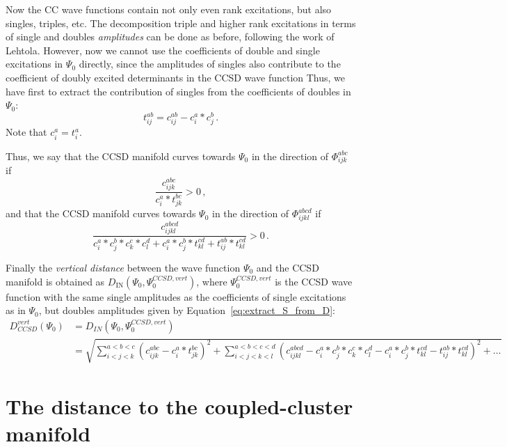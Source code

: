 Now the CC wave functions contain not only even rank excitations,
but also singles, triples, etc.
The decomposition triple and higher rank excitations in terms of single and doubles \emph{amplitudes}
can be done as before, following the work of Lehtola.
However, now we cannot use the coefficients of double and single excitations in $\Psi_0$
directly, since the amplitudes of singles also contribute to the coefficient of doubly excited
determinants in the CCSD wave function
Thus, we have first to extract the contribution of singles
from the coefficients of doubles in $\Psi_0$:
\begin{equation}\label{eq:extract_S_from_D}
  t_{ij}^{ab} = c_{ij}^{ab} - c_i^a * c_j^b\,.
\end{equation}
Note that $c_i^a = t_i^a$.

Thus, we say that the CCSD manifold curves towards $\Psi_0$ in the direction of
$\Phi_{ijk}^{abc}$ if
\begin{equation}
  \frac{c_{ijk}^{abc}}{c_{i}^{a} * t_{jk}^{bc}} > 0\,,
\end{equation}
and that the CCSD manifold curves towards $\Psi_0$ in the direction of
$\Phi_{ijkl}^{abcd}$ if
\begin{equation}
  \frac{c_{ijkl}^{abcd}}
  {c_{i}^{a} * c_{j}^{b} * c_{k}^{c} * c_{l}^{d}
    + c_{i}^{a} * c_{j}^{b} * t_{kl}^{cd}
    + t_{ij}^{ab} * t_{kl}^{cd}} > 0\,.
\end{equation}

Finally the \emph{vertical distance} between the wave function $\Psi_0$
and the CCSD manifold is obtained as
$D_\text{IN}(\Psi_0, \Psi_0^{CCSD,vert})$, where $\Psi_0^{CCSD,vert}$ is the CCSD wave function
with the same single amplitudes as the coefficients of single excitations as in $\Psi_0$,
but doubles amplitudes given by Equation~\eqref{eq:extract_S_from_D}:
\begin{equation}
  \begin{split}
    D_{CCSD}^{vert}(\Psi_0) &= 
    D_{IN}(\Psi_0, \Psi_0^{CCSD,vert})\\
    &= \sqrt{
      \sum_{i<j<k}^{a<b<c}
      (c_{ijk}^{abc} - c_{i}^{a} * t_{jk}^{bc})^2
      + \sum_{i<j<k<l}^{a<b<c<d}
      (c_{ijkl}^{abcd}
      - c_{i}^{a} * c_{j}^{b} * c_{k}^{c} * c_{l}^{d}
      - c_{i}^{a} * c_{j}^{b} * t_{kl}^{cd}
      - t_{ij}^{ab} * t_{kl}^{cd})^2 + \dots
    }
  \end{split}
\end{equation}

\section{The distance to the coupled-cluster manifold}
\hypertarget{sec:dist_cc_man}{}
\label{sec:dist_cc_man}

